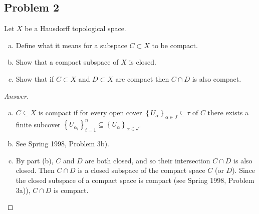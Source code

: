 \documentclass[12pt]{article}
\newcommand\setb[1]{\left \{ #1 \right \}}
\theoremstyle{definition}
\begin{document}
\subsection{Problem 2}
Let $X$ be a Hausdorff topological space.
\begin{enumerate}[(a)]
    \item Define what it means for a subspace $C \subset X$ to be compact.
    \item Show that a compact subspace of $X$ is closed.
    \item Show that if $C \subset X$ and $D \subset X$ are compact then $C \cap D$ is also compact.
\end{enumerate}
\begin{proof}[Answer]
    \noindent
    \begin{enumerate}[(a)]
        \item $C \subseteq X$ is compact if for every open cover $\setb{ U_{\alpha} }_{\alpha \in J} \subseteq \tau$ of $C$ there exists a finite subcover $\setb{ U_{\alpha_i} }_{i=1}^n \subseteq \setb{ U_{\alpha} }_{\alpha \in J}$.
        \item See Spring 1998, Problem 3b).
        \item By part (b), $C$ and $D$ are both closed, and so their intersection $C \cap D$ is also closed. Then $C \cap D$ is a closed subspace of the compact space $C$ (or $D$). Since the closed subspace of a compact space is compact (see Spring 1998, Problem 3a)), $C \cap D$ is compact.
    \end{enumerate}
\end{proof}
\end{document}

